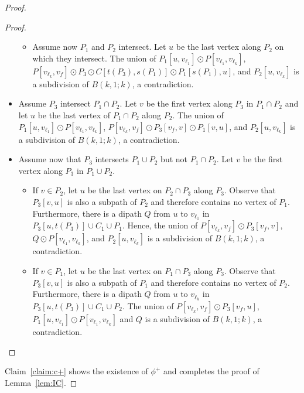 \documentclass{endm}
\begin{document}
\begin{proof}
\begin{proof}
\begin{itemize}
\begin{itemize}
		\item Assume now $P_1$ and $P_2$ intersect. Let $u$ be the last vertex along $P_2$ on which they intersect. The union of $P_1[u,v_{\ell_1}]\odot P[v_{\ell_1}, v_{\ell_k}]$, $P[v_{\ell_k}, v_f]\odot P_3\odot C[t(P_3), s(P_1)]\odot P_1[s(P_1), u]$, and $P_2[u, v_{\ell_k}]$ is a subdivision of $B(k,1;k)$, a contradiction.
	\end{itemize}

	\item Assume $P_3$ intersect $P_1\cap P_2$. Let $v$ be the first vertex along $P_3$ in $P_1\cap P_2$ and let $u$ be the last vertex of $P_1\cap P_2$ along $P_2$. The union of $P_1[u,v_{\ell_1}]\odot P[v_{\ell_1}, v_{\ell_k}]$, $P[v_{\ell_k}, v_f]\odot P_3[v_f,v]\odot P_1[v, u]$, and $P_2[u, v_{\ell_k}]$ is a subdivision of $B(k,1;k)$, a contradiction.

	\item Assume now that $P_3$ intersects $P_1\cup P_2$ but not $P_1\cap P_2$. Let $v$ be the first vertex along $P_3$ in $P_1\cup P_2$.
	\begin{itemize}
	\item If $v \in P_2$, let $u$ be the last vertex on $P_2\cap P_3$ along $P_3$. Observe that $P_3[v,u]$ is also a subpath of $P_2$ and therefore contains no vertex of $P_1$. Furthermore, there is a dipath $Q$ from $u$ to $v_{\ell_1}$ in $P_3[u, t(P_3)]\cup C_1\cup  P_1$. Hence, the union of $P[v_{\ell_k}, v_f] \odot P_3[v_f,v]$, $Q\odot P[v_{\ell_1},v_{\ell_k}]$, and $P_2[u,v_{\ell_k}]$ is a subdivision of $B(k,1;k)$, a contradiction.
	
	\item If $v\in P_1$, let $u$ be the last vertex on $P_1\cap P_3$ along $P_3$.  Observe that $P_3[v,u]$ is also a subpath of $P_1$ and therefore contains no vertex of $P_2$. Furthermore, there is a dipath $Q$ from $u$ to $v_{\ell_k}$ in $P_3[u, t(P_3)]\cup C_1\cup  P_2$.
	The union of $P[v_{\ell_k}, v_f] \odot P_3[v_f,u]$, $P_1[u, v_{\ell_1}]\odot P[v_{\ell_1}, v_{\ell_k}]$ and $Q$ is a subdivision of $B(k,1;k)$, a contradiction.

	\end{itemize}
\end{itemize}
\end{proof}

Claim~\ref{claim:c+} shows the existence of $\phi^+$ and completes the proof of Lemma~\ref{lem:IC}.
\end{proof}
\end{document}
